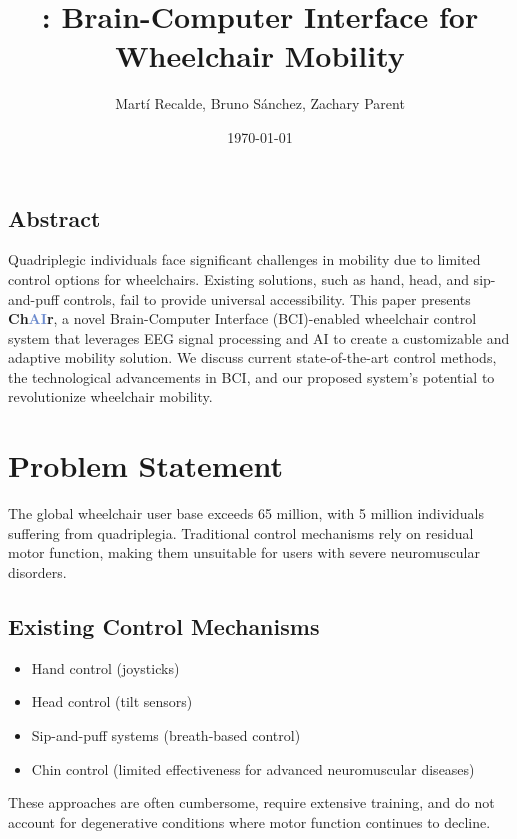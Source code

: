 \documentclass[a4paper]{article}
\title{\chair: Brain-Computer Interface for Wheelchair Mobility}
\author{Mart\'i Recalde, Bruno S\'anchez, Zachary Parent}
\date{\today}
\newcommand\chair{\textbf{Ch\textcolor[HTML]{6B8ACD}{AI}r}\xspace}
\begin{document}
\begin{titlepage}
    \maketitle
    \vspace{2cm}
    \tableofcontents
    \section{Abstract}
    Quadriplegic individuals face significant challenges in mobility due to
    limited control options for wheelchairs. Existing solutions, such as hand,
    head, and sip-and-puff controls, fail to provide universal accessibility.
    This paper presents \chair, a novel Brain-Computer Interface (BCI)-enabled
    wheelchair control system that leverages EEG signal processing and AI to
    create a customizable and adaptive mobility solution. We discuss current
    state-of-the-art control methods, the technological advancements in BCI,
    and our proposed system's potential to revolutionize wheelchair mobility.    
\end{titlepage}


\section{Problem Statement}

The global wheelchair user base exceeds 65 million, with 5 million individuals
suffering from quadriplegia. Traditional control mechanisms rely on residual
motor function, making them unsuitable for users with severe neuromuscular disorders. 

\subsection{Existing Control Mechanisms}
\begin{itemize}
    \item Hand control (joysticks)
    \item Head control (tilt sensors)
    \item Sip-and-puff systems (breath-based control)
    \item Chin control (limited effectiveness for advanced neuromuscular diseases)
\end{itemize}

These approaches are often cumbersome, require extensive training, and do not account
for degenerative conditions where motor function continues to decline.
\end{document}
